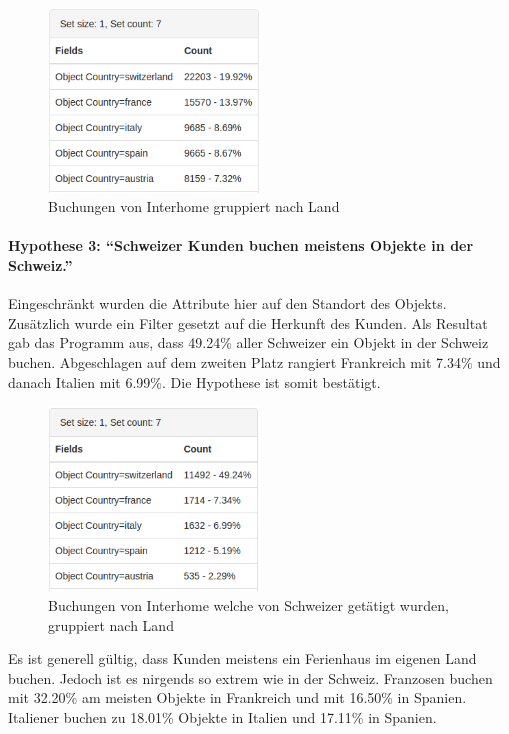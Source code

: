 \begin{figure}[H]
	\RawFloats
	\centering
	\includegraphics[width=0.5\textwidth]{images/hypothese2}
	\caption{Buchungen von Interhome gruppiert nach Land}
	\label{fig:testingfazit:testing:hypothesen:hypothese2}
\end{figure}

\paragraph{Hypothese 3: "`Schweizer Kunden buchen meistens Objekte in der Schweiz."'} Eingeschränkt wurden die Attribute hier auf den Standort des Objekts. Zusätzlich wurde ein Filter gesetzt auf die Herkunft des Kunden. Als Resultat gab das Programm aus, dass 49.24\% aller Schweizer ein Objekt in der Schweiz buchen. Abgeschlagen auf dem zweiten Platz rangiert Frankreich mit 7.34\% und danach Italien mit 6.99\%. Die Hypothese ist somit bestätigt.

\begin{figure}[H]
	\RawFloats
	\centering
	\includegraphics[width=0.5\textwidth]{images/hypothese3-1}
	\caption{Buchungen von Interhome welche von Schweizer getätigt wurden, gruppiert nach Land}
	\label{fig:testingfazit:testing:hypothesen:hypothese3:1}
\end{figure}

Es ist generell gültig, dass Kunden meistens ein Ferienhaus im eigenen Land buchen. Jedoch ist es nirgends so extrem wie in der Schweiz. Franzosen buchen mit 32.20\% am meisten Objekte in Frankreich und mit 16.50\% in Spanien. Italiener buchen zu 18.01\% Objekte in Italien und 17.11\% in Spanien.

